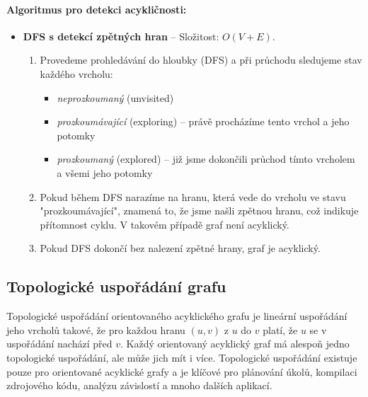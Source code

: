 \paragraph*{Algoritmus pro detekci acykličnosti:}
\begin{itemize}
\item \textbf{DFS s detekcí zpětných hran} -- Složitost: $O(V + E)$.
\begin{enumerate}
    \item Provedeme prohledávání do hloubky (DFS) a při průchodu sledujeme stav každého vrcholu: 
    \begin{itemize}
        \item \textit{neprozkoumaný} (unvisited)
        \item \textit{prozkoumávající} (exploring) – právě procházíme tento vrchol a jeho potomky
        \item \textit{prozkoumaný} (explored) – již jsme dokončili průchod tímto vrcholem a všemi jeho potomky
    \end{itemize}
    \item Pokud během DFS narazíme na hranu, která vede do vrcholu ve stavu "prozkoumávající", znamená to, že jsme našli zpětnou hranu, což indikuje přítomnost cyklu. V takovém případě graf není acyklický.
    \item Pokud DFS dokončí bez nalezení zpětné hrany, graf je acyklický.
\end{enumerate}
\end{itemize}

\subsection{Topologické uspořádání grafu}
Topologické uspořádání orientovaného acyklického grafu je lineární uspořádání jeho 
vrcholů takové, že pro každou hranu $(u, v)$ z $u$ do $v$ platí, že $u$ se v 
uspořádání nachází před $v$. Každý orientovaný acyklický graf má alespoň jedno 
topologické uspořádání, ale může jich mít i více.
Topologické uspořádání existuje pouze pro orientované 
acyklické grafy a je klíčové pro plánování úkolů, kompilaci zdrojového kódu, analýzu 
závislostí a mnoho dalších aplikací.

